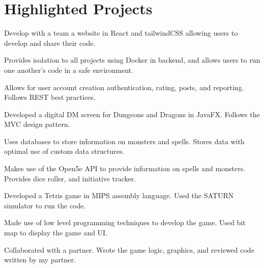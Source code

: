 \documentclass[letterpaper,10pt]{article}
\begin{document}

    \section{Highlighted Projects}

    \begin{resume_list}
        \item Develop with a team a website in React and tailwindCSS allowing users to develop and share their code.
        \item Provides isolation to all projects using Docker in backend, and allows users to run one another's code in a safe environment.
        \item Allows for user account creation authentication, rating, posts, and reporting. Follows REST best practices.
    \end{resume_list}
    \begin{resume_list}
        \item Developed a digital DM screen for Dungeons and Dragons in JavaFX. Follows the MVC design pattern.
        \item Uses databases to store information on monsters and spells. Stores data with optimal use of custom data structures.
        \item Makes use of the Open5e API to provide information on spells and monsters. Provides dice roller, and initiative tracker.
        
    \end{resume_list}
    \begin{resume_list}
        \item Developed a Tetris game in MIPS assembly language. Used the SATURN simulator to run the code.
        \item Made use of low level programming techniques to develop the game. Used bit map to display the game and UI.
        \item Collaborated with a partner. Wrote the game logic, graphics, and reviewed code written by my partner.
    \end{resume_list}
\end{document}
